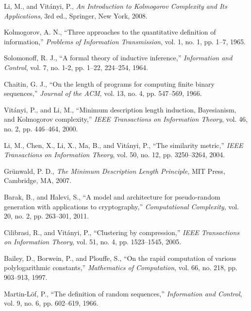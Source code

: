 \documentclass[12pt,a4paper]{report}
\begin{document}

\begin{thebibliography}{99}

Li, M., and Vitányi, P., \textit{An Introduction to Kolmogorov Complexity and Its Applications}, 3rd ed., Springer, New York, 2008.

Kolmogorov, A. N., ``Three approaches to the quantitative definition of information,'' \textit{Problems of Information Transmission}, vol. 1, no. 1, pp. 1--7, 1965.

Solomonoff, R. J., ``A formal theory of inductive inference,'' \textit{Information and Control}, vol. 7, no. 1-2, pp. 1--22, 224--254, 1964.

Chaitin, G. J., ``On the length of programs for computing finite binary sequences,'' \textit{Journal of the ACM}, vol. 13, no. 4, pp. 547--569, 1966.

Vitányi, P., and Li, M., ``Minimum description length induction, Bayesianism, and Kolmogorov complexity,'' \textit{IEEE Transactions on Information Theory}, vol. 46, no. 2, pp. 446--464, 2000.

Li, M., Chen, X., Li, X., Ma, B., and Vitányi, P., ``The similarity metric,'' \textit{IEEE Transactions on Information Theory}, vol. 50, no. 12, pp. 3250--3264, 2004.

Grünwald, P. D., \textit{The Minimum Description Length Principle}, MIT Press, Cambridge, MA, 2007.

Barak, B., and Halevi, S., ``A model and architecture for pseudo-random generation with applications to cryptography,'' \textit{Computational Complexity}, vol. 20, no. 2, pp. 263--301, 2011.

Cilibrasi, R., and Vitányi, P., ``Clustering by compression,'' \textit{IEEE Transactions on Information Theory}, vol. 51, no. 4, pp. 1523--1545, 2005.

Bailey, D., Borwein, P., and Plouffe, S., ``On the rapid computation of various polylogarithmic constants,'' \textit{Mathematics of Computation}, vol. 66, no. 218, pp. 903--913, 1997.

Martin-Löf, P., ``The definition of random sequences,'' \textit{Information and Control}, vol. 9, no. 6, pp. 602--619, 1966.


\end{thebibliography}
\end{document}

